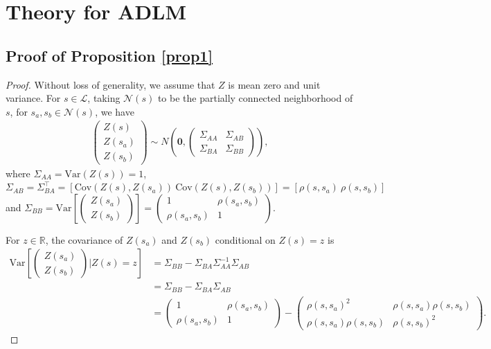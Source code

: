 \documentclass{article}
\newcommand{\Var}{\mathrm{Var}}
\newcommand{\Cov}{\mathrm{Cov}}
\begin{document}
\newpage
\appendix
\label{sec:headings}

\section{Theory for ADLM}
\label{appendix.a}
\subsection{Proof of Proposition \ref{prop1}\label{appendix.a1}}
\begin{proof}
Without loss of generality, we assume that $Z$ is mean zero and unit variance. For $s \in \mathcal{L}$, taking $\mathcal{N}(s)$ to be the partially connected neighborhood of $s$, for $s_a, s_b \in \mathcal{N}(s)$, we have
\begin{align*}
    \begin{pmatrix} Z(s) \\ Z(s_a) \\ Z(s_b) \end{pmatrix} \sim N\left(\mathbf{0}, \begin{pmatrix} \Sigma_{AA} & \Sigma_{AB} \\ \Sigma_{BA} & \Sigma_{BB} \end{pmatrix}\right),
\end{align*}
where $\Sigma_{AA} = \Var(Z(s)) = 1$, $\Sigma_{AB} = \Sigma_{BA}^\top = \left[\Cov(Z(s), Z(s_a))\  \Cov(Z(s), Z(s_b))\right] = \left[\rho(s,s_a)\ \rho(s, s_b)\right]$ and $\Sigma_{BB} = \Var\left[\begin{pmatrix} Z(s_a) \\ Z(s_b) \end{pmatrix}\right] = \begin{pmatrix}
    1 & \rho(s_a, s_b) \\ \rho(s_a, s_b) & 1
    \end{pmatrix} $.

For $z \in \mathbb{R}$, the covariance of $Z(s_a)$ and $Z(s_b)$ conditional on $Z(s)=z$ is 
\begin{align*}
    \Var\left[\begin{pmatrix} Z(s_a) \\ Z(s_b) \end{pmatrix}\Bigg|Z(s) = z\right] &= \Sigma_{BB} - \Sigma_{BA}\Sigma_{AA}^{-1}\Sigma_{AB}\\ &= \Sigma_{BB} - \Sigma_{BA}\Sigma_{AB} \\ &= \begin{pmatrix}
    1 & \rho(s_a, s_b) \\ \rho(s_a, s_b) & 1
    \end{pmatrix} - \begin{pmatrix}
    \rho(s, s_a)^2 & \rho(s, s_a)\rho(s, s_b) \\ \rho(s, s_a)\rho(s, s_b) & \rho(s, s_b)^2
    \end{pmatrix}.
\end{align*}


\end{proof}
\end{document}
